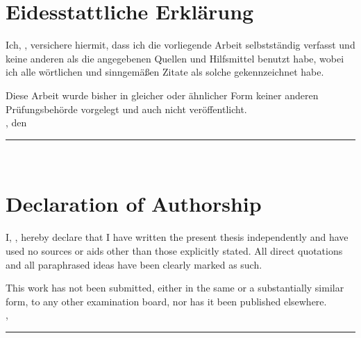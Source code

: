 \chapter*{Eidesstattliche Erklärung}
%
Ich, \autor, versichere hiermit, dass ich die vorliegende Arbeit
selbstständig verfasst und keine anderen als die angegebenen Quellen und Hilfsmittel benutzt habe, wobei ich alle wörtlichen und sinngemäßen Zitate als solche gekennzeichnet habe.\par
%
Diese Arbeit wurde bisher in gleicher oder ähnlicher Form keiner anderen Prüfungsbehörde vorgelegt und auch nicht veröffentlicht.\\[5ex]
%
\ort, den \datum\\[5ex]
%
\rule[-0.2cm]{5cm}{0.5pt}\\
%
\textsc{\autor} 

\chapter*{Declaration of Authorship}
%
I, \autor, hereby declare that I have written the present thesis independently and have used no sources or aids other than those explicitly stated. All direct quotations and all paraphrased ideas have been clearly marked as such.\par
%
This work has not been submitted, either in the same or a substantially similar form, to any other examination board, nor has it been published elsewhere.\\[5ex]
%
\ort, \datum\\[5ex]
%
\rule[-0.2cm]{5cm}{0.5pt}\\
%
\textsc{\autor}